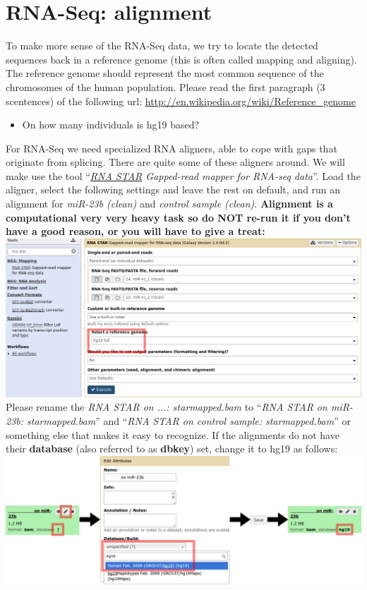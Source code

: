 \section{RNA-Seq: alignment}
To make more sense of the RNA-Seq data, we try to locate the detected sequences back in a reference genome (this is often called mapping and aligning). The reference genome should represent the most common sequence of the chromosomes of the human population. Please read the first paragraph (3 scentences) of the following url: \url{http://en.wikipedia.org/wiki/Reference_genome}
\begin{itemize}
	\item On how many individuals is hg19 based?
\end{itemize}
For RNA-Seq we need specialized RNA aligners, able to cope with gaps that originate from splicing. There are quite some of these aligners around. We will make use the tool ``\textit{\underline{RNA STAR} Gapped-read mapper for RNA-seq data}''. Load the aligner, select the following settings and leave the rest on default, and run an alignment for \textit{miR-23b (clean)} and \textit{control sample (clean)}. \textbf{Alignment is a computational very very heavy task so do NOT re-run it if you don't have a good reason, or you will have to give a treat:}\\
\includegraphics[width=\textwidth]{figures/alignment_01.png}\\
Please rename the \textit{RNA STAR on ...: starmapped.bam} to ``\textit{RNA STAR on miR-23b: starmapped.bam}'' and ``\textit{RNA STAR on control sample: starmapped.bam}'' or something else that makes it easy to recognize.
If the alignments do not have their \textbf{database} (also referred to as \textbf{dbkey}) set, change it to hg19 as follows:\\
\includegraphics[width=\textwidth]{figures/alignment_02.png}\\

